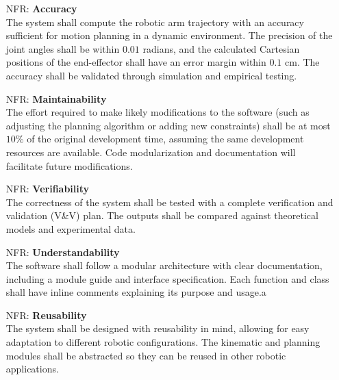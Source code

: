 \documentclass[12pt]{article}
\newcounter{nfrnum} %
\begin{document}
  \noindent \begin{itemize}
  
  \item[NFR\refstepcounter{nfrnum}\thenfrnum \label{NFR_Accuracy}:]  
    \textbf{Accuracy} \\
    The system shall compute the robotic arm trajectory with an accuracy sufficient for motion planning in a dynamic environment. The precision of the joint angles shall be within \(0.01\) radians, and the calculated Cartesian positions of the end-effector shall have an error margin within \(0.1\) cm. The accuracy shall be validated through simulation and empirical testing.
  
  \item[NFR\refstepcounter{nfrnum}\thenfrnum \label{NFR_Maintainability}:]  
    \textbf{Maintainability} \\
    The effort required to make likely modifications to the software (such as adjusting the planning algorithm or adding new constraints) shall be at most \(10\%\) of the original development time, assuming the same development resources are available. Code modularization and documentation will facilitate future modifications.

  \item[NFR\refstepcounter{nfrnum}\thenfrnum \label{NFR_Verifiability}:]  
    \textbf{Verifiability} \\
    The correctness of the system shall be tested with a complete verification and validation (V\&V) plan. The outputs shall be compared against theoretical models and experimental data.
  
  \item[NFR\refstepcounter{nfrnum}\thenfrnum \label{NFR_Understandability}:]  
    \textbf{Understandability} \\
    The software shall follow a modular architecture with clear documentation, including a module guide and interface specification. Each function and class shall have inline comments explaining its purpose and usage.a
  
  \item[NFR\refstepcounter{nfrnum}\thenfrnum \label{NFR_Reusability}:]  
    \textbf{Reusability} \\
    The system shall be designed with reusability in mind, allowing for easy adaptation to different robotic configurations. The kinematic and planning modules shall be abstracted so they can be reused in other robotic applications.
  
  \end{itemize}
  
\end{document}
